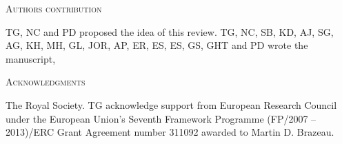 \documentclass[12pt,letterpaper]{article}
\renewcommand{\section}[1]{%
\bigskip
\begin{center}
\begin{Large}
\normalfont\scshape #1
\medskip
\end{Large}
\end{center}}
\begin{document}












\section{Authors contribution}
TG, NC and PD proposed the idea of this review. TG, NC, SB, KD, AJ, SG, AG, KH, MH, GL, JOR, AP, ER, ES, ES, GS, GHT and PD wrote the manuscript,

\section{Acknowledgments}
The Royal Society.
TG acknowledge support from European Research Council under the European Union's Seventh Framework Programme (FP/2007 – 2013)/ERC Grant Agreement number 311092 awarded to Martin D. Brazeau.




\end{document}
